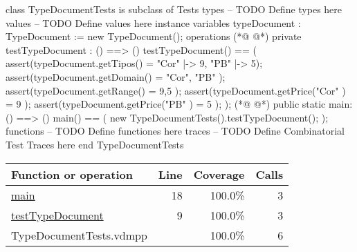\begin{vdmpp}[breaklines=true]
class TypeDocumentTests is subclass of Tests
types
-- TODO Define types here
values
-- TODO Define values here
instance variables
typeDocument : TypeDocument := new TypeDocument();
operations
(*@
\label{testTypeDocument:9}
@*)
private testTypeDocument : () ==> ()
testTypeDocument() ==
(
 assert(typeDocument.getTipos() = { "Cor" |-> 9, "PB" |-> 5});
 assert(typeDocument.getDomain() = { "Cor", "PB" });
 assert(typeDocument.getRange() = { 9,5 });
 assert(typeDocument.getPrice("Cor" ) = 9 );
 assert(typeDocument.getPrice("PB" ) = 5 );
);
(*@
\label{main:18}
@*)
public static main: () ==> ()
 main() ==
 (
  new TypeDocumentTests().testTypeDocument();
 );
functions
-- TODO Define functiones here
traces
-- TODO Define Combinatorial Test Traces here
end TypeDocumentTests
\end{vdmpp}
\bigskip
\begin{longtable}{|l|r|r|r|}
\hline
Function or operation & Line & Coverage & Calls \\
\hline
\hline
\hyperref[main:18]{main} & 18&100.0\% & 3 \\
\hline
\hyperref[testTypeDocument:9]{testTypeDocument} & 9&100.0\% & 3 \\
\hline
\hline
TypeDocumentTests.vdmpp & & 100.0\% & 6 \\
\hline
\end{longtable}


